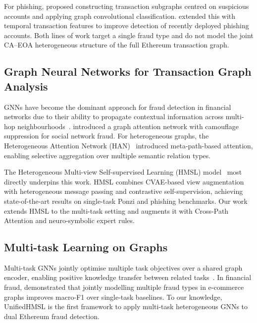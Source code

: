 \documentclass[conference]{IEEEtran}
\begin{document}
For phishing, \cite{wu2020phishing} proposed constructing transaction
subgraphs centred on suspicious accounts and applying graph
convolutional classification.  \cite{lin2022phishing} extended this
with temporal transaction features to improve detection of recently
deployed phishing accounts.
Both lines of work target a single fraud type and do not model the
joint CA--EOA heterogeneous structure of the full Ethereum transaction
graph.

\subsection{Graph Neural Networks for Transaction Graph Analysis}
GNNs have become the dominant approach for fraud detection in
financial networks due to their ability to propagate contextual
information across multi-hop
neighbourhoods~\cite{liu2021fraud}.
\cite{dou2020commdetect} introduced a graph attention network with
camouflage suppression for social network fraud.
For heterogeneous graphs, the Heterogeneous Attention Network
(HAN)~\cite{wang2019heterogeneous} introduced meta-path-based
attention, enabling selective aggregation over multiple semantic
relation types.

The Heterogeneous Multi-view Self-supervised Learning
(HMSL) model~\cite{paper_baseline_2408.00641} most directly
underpins this work.  HMSL combines CVAE-based view augmentation
with heterogeneous message passing and contrastive self-supervision,
achieving state-of-the-art results on single-task Ponzi and phishing
benchmarks.  Our work extends HMSL to the multi-task setting and
augments it with Cross-Path Attention and neuro-symbolic expert rules.

\subsection{Multi-task Learning on Graphs}
Multi-task GNNs jointly optimise multiple task objectives over a shared
graph encoder, enabling positive knowledge transfer between related
tasks~\cite{standley2020tasks}.
In financial fraud, \cite{zheng2021fraud} demonstrated that jointly
modelling multiple fraud types in e-commerce graphs improves macro-F1
over single-task baselines.
To our knowledge, UnifiedHMSL is the first framework to apply
multi-task heterogeneous GNNs to dual Ethereum fraud detection.
\end{document}
